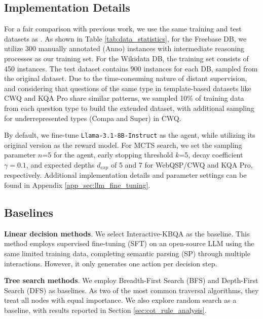 \subsection{Implementation Details}
\label{sec:imp_details}

For a fair comparison with previous work, we use the same training and test datasets as \citet{Xiong-Guanming-ACL-2024-Interactive-KBQA}. 
As shown in Table \ref{tab:data_statistics}, for the Freebase DB, we utilize 300 manually annotated (Anno) instances with intermediate reasoning processes as our training set. 
For the Wikidata DB, the training set consists of 450 instances. The test dataset contains 900 instances for each DB, sampled from the original dataset.
Due to the time-consuming nature of distant supervision, and considering that questions of the same type in template-based datasets like CWQ and KQA Pro share similar patterns, we sampled 10\% of training data from each question type to build the extended dataset, with additional sampling for underrepresented types (Compa and Super) in CWQ.

By default, we fine-tune \texttt{Llama-3.1-8B-Instruct} \citep{Aaron-etal-arXiv-2024-Llama3} as the agent, while utilizing its original version as the reward model. 
For MCTS search, we set the sampling parameter $n$=5 for the agent, early stopping threshold $k$=5, decay coefficient $\gamma=0.1$, and expected depths $d_{exp}$ of 5 and 7 for WebQSP/CWQ and KQA Pro, respectively.
Additional implementation details and parameter settings can be found in Appendix \ref{app_sec:llm_fine_tuning}.

\subsection{Baselines}

\textbf{Linear decision methods}.
We select Interactive-KBQA \citep{Xiong-Guanming-ACL-2024-Interactive-KBQA} as the baseline. This method employs supervised fine-tuning (SFT) on an open-source LLM using the same limited training data, completing semantic parsing (SP) through multiple interactions. However, it only generates one action per decision step.

\textbf{Tree search methods}.
We employ Breadth-First Search (BFS) and Depth-First Search (DFS) as baselines. As two of the most common traversal algorithms, they treat all nodes with equal importance. We also explore random search as a baseline, with results reported in Section \ref{sec:cot_rule_analysis}.

